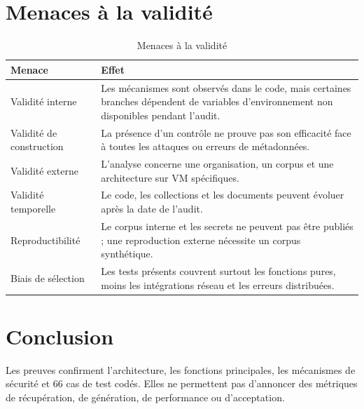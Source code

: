 \section{Menaces à la validité}
\begin{table}[H]
\centering
\caption{Menaces à la validité}
\label{tab:validity_ch7}
\begin{tabular}{p{4.0cm}p{9.5cm}}
\toprule
\textbf{Menace} & \textbf{Effet} \\
\midrule
Validité interne & Les mécanismes sont observés dans le code, mais certaines branches dépendent de variables d’environnement non disponibles pendant l’audit. \\
Validité de construction & La présence d’un contrôle ne prouve pas son efficacité face à toutes les attaques ou erreurs de métadonnées. \\
Validité externe & L’analyse concerne une organisation, un corpus et une architecture sur VM spécifiques. \\
Validité temporelle & Le code, les collections et les documents peuvent évoluer après la date de l’audit. \\
Reproductibilité & Le corpus interne et les secrets ne peuvent pas être publiés ; une reproduction externe nécessite un corpus synthétique. \\
Biais de sélection & Les tests présents couvrent surtout les fonctions pures, moins les intégrations réseau et les erreurs distribuées. \\
\bottomrule
\end{tabular}
\end{table}
\section{Conclusion}
Les preuves confirment l'architecture, les fonctions principales, les mécanismes de sécurité et 66 cas de test codés. Elles ne permettent pas d'annoncer des métriques de récupération, de génération, de performance ou d'acceptation.

